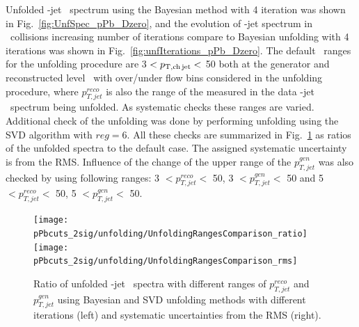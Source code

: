 Unfolded \Dzero-jet \pt\ spectrum using the Bayesian method with 4 iteration was shown in Fig.~\ref{fig:UnfSpec_pPb_Dzero}, and the evolution of \Dzero-jet spectrum in \pp\ collisions increasing number of iterations compare to Bayesian unfolding with 4 iterations was shown in Fig.~\ref{fig:unfIterations_pPb_Dzero}. 
The default \ptchjet\ ranges for the unfolding procedure are 3 $< p_{\mathrm{T,ch\, jet}}< $ 50 both at the generator and reconstructed level \pt\, with over/under flow bins considered in the unfolding procedure, where $p_{T,jet}^{reco}$ is also the range of the measured in the data \Dzero-jet \pt\ spectrum being unfolded. 
As systematic checks these ranges are varied.
Additional check of the unfolding was done by performing unfolding using the SVD algorithm with $reg=6$.
All these checks are summarized in Fig.~\ref{fig:UnfSpec_pPb_Dzero_ranges} as ratios of the unfolded spectra to the default case. The assigned systematic uncertainty is from the RMS.
Influence of the change of the upper range of the $p_{T,jet}^{gen}$ was also checked by using following ranges: 3 $<  p_{T,jet}^{reco} < $ 50, 3 $<  p_{T,jet}^{gen} < $ 50 and 5 $<  p_{T,jet}^{reco} < $ 50, 5 $<  p_{T,jet}^{gen} < $ 50. 

\begin{figure}[bth]
\centering
\texttt{[image: pPbcuts\_2sig/unfolding/UnfoldingRangesComparison\_ratio]}
\texttt{[image: pPbcuts\_2sig/unfolding/UnfoldingRangesComparison\_rms]}
\caption{Ratio of unfolded \Dzero-jet \pt\ spectra with different ranges of $p_{T,jet}^{reco}$ and $p_{T,jet}^{gen}$ using Bayesian and SVD unfolding methods with different iterations (left) and systematic uncertainties from the RMS (right).}
\label{fig:UnfSpec_pPb_Dzero_ranges}
\end{figure}



